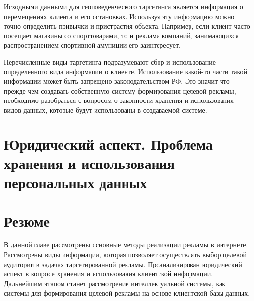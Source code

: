Исходными данными для геоповеденческого таргетинга является информация о перемещениях клиента и его остановках. Используя эту информацию можно точно определить привычки и пристрастия объекта. Например, если клиент часто посещает магазины со спорттоварами, то и реклама компаний, занимающихся распространением спортивной амуниции его заинтересует.

Перечисленные виды таргетинга подразумевают сбор и использование определенного вида информации о клиенте. Использование какой-то части такой информации может быть запрещено законодательством РФ. Это значит что прежде чем создавать собственную систему формирования целевой рекламы, необходимо разобраться с вопросом о законности хранения и использования видов данных, которые будут использованы в создаваемой системе.
        
\section{Юридический аспект. Проблема хранения и использования персональных данных}

\section{Резюме}

В данной главе рассмотрены основные методы реализации рекламы в интернете. Рассмотрены виды информации, которая позволяет осуществлять выбор целевой аудитории в задачах таргетированной рекламы. Проанализирован юридический аспект в вопросе хранения и использования клиентской информации. Дальнейшим этапом станет рассмотрение интеллектуальной системы, как системы для формирования целевой рекламы на основе клиентской базы данных.